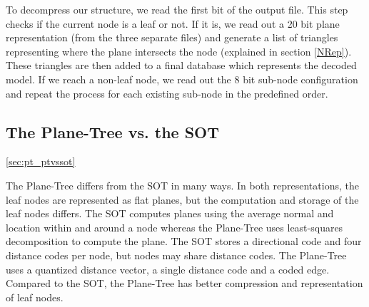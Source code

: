 To decompress our structure, we read the first bit of the output file. This step checks if the current node is a leaf or not. If it is, we read out a 20 bit plane representation (from the three separate files) and generate a list of triangles representing where the plane intersects the node (explained in section \ref{NRep}). These triangles are then added to a final database which represents the decoded model. If we reach a non-leaf node, we read out the 8 bit sub-node configuration and repeat the process for each existing sub-node in the predefined order. \\  

\subsection{The Plane-Tree vs. the SOT}
\ref{sec:pt_ptvssot}

The Plane-Tree differs from the SOT in many ways. In both representations, the leaf nodes are represented as flat planes, but the computation and storage of the leaf nodes differs. The SOT computes planes using the average normal and location within and around a node whereas the Plane-Tree uses least-squares decomposition to compute the plane. The SOT stores a directional code and four distance codes per node, but nodes may share distance codes. The Plane-Tree uses a quantized distance vector, a single distance code and a coded edge. Compared to the SOT, the Plane-Tree has better compression and representation of leaf nodes.
